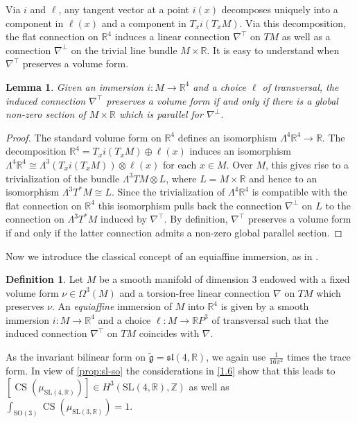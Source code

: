 \documentclass[british,11pt,a4paper]{amsart}
\numberwithin{equation}{section}
\renewcommand\Bbb{\mathbb}
\newcommand{\x}{\times}
\newcommand{\La}{\Lambda}
\newcommand{\Om}{\Omega}
\newcommand{\CS}{\operatorname{CS}}
\newcommand{\tfg}{\widetilde{\mathfrak g}}
\newcommand{\Z}{\mathbb{Z}}
\newcommand*{\R}{\mathbb{R}}
\newcommand{\col}{:}
\newcounter{theorem}
\numberwithin{theorem}{section}
\newtheorem{lemma}[theorem]{Lemma}
\theoremstyle{definition}
\newtheorem{definition}[theorem]{Definition}
\theoremstyle{remark}
\begin{document}
Via $i$ and $\ell$, any tangent vector at a point $i(x)$ decomposes uniquely into a
component in $\ell(x)$ and a component in $T_xi(T_xM)$. Via this decomposition, the
flat connection on $\R^4$ induces a linear connection $\nabla^\top$ on $TM$ as
well as a connection $\nabla^\perp$ on the trivial line bundle $M\x\R$. It is
easy to understand when $\nabla^\top$ preserves a volume form.

\begin{lemma}\label{lemma:volume}
Given an immersion $i\col M\to\R^4$ and a choice $\ell$ of transversal, the induced
connection $\nabla^\top$ preserves a volume form if and only if there is a global
non-zero section of $M\x\R$ which is parallel for $\nabla^\perp$.
\end{lemma}
\begin{proof}
The standard volume form on $\R^4$ defines an isomorphism $\Lambda^4\Bbb
R^4\to\R$. The decomposition $\R^4=T_xi(T_xM)\oplus\ell(x)$ induces an
isomorphism $\Lambda^4\R^4\cong \Lambda^3(T_xi(T_xM))\otimes\ell(x)$ for each
$x\in M$. Over $M$, this gives rise to a trivialization of the bundle $\La^3TM\otimes
L$, where $L=M\x\R$ and hence to an isomorphism $\La^3T^*M\cong L$. Since the
trivialization of $\La^4\R^4$ is compatible with the flat connection on $\Bbb
R^4$ this isomorphism pulls back the connection $\nabla^\perp$ on $L$ to the
connection on $\La^3T^*M$ induced by $\nabla^\top$. By definition, $\nabla^\top$
preserves a volume form if and only if the latter connection admits a non-zero global
parallel section.
\end{proof}

Now we introduce the classical concept of an equiaffine immersion, as in
\cite[Defintion 1.4]{MR1311248}.
\begin{definition}\label{def:equiaffine}
Let $M$ be a smooth manifold of dimension $3$ endowed with a fixed
  volume form $\nu\in\Om^3(M)$ and a torsion-free linear connection $\nabla$ on $TM$
which preserves $\nu$. An \textit{equiaffine} immersion of $M$ into
$\R^4$ is given by a smooth immersion $i\col M\to\R^4$ and a choice $\ell\col
M\to\R P^3$ of transversal such that the induced connection
$\nabla^\top$ on $TM$ coincides with $\nabla$.
\end{definition}

 As the invariant bilinear form on $\tfg=\mathfrak{sl}(4,\R)$, we again
  use $\tfrac{1}{16\pi^2}$ times the trace form. In view of \cref{prop:sl-so} the
  considerations in \cref{1.6} show that this leads to
  $[\CS(\mu_{\mathrm{SL}(4,\R)})]\in H^3(\mathrm{SL}(4,\R),\Z)$ as well as
  $\int_{\mathrm{SO}(3)}\CS(\mu_{\mathrm{SL}(3,\R)})=1$.
\end{document}
